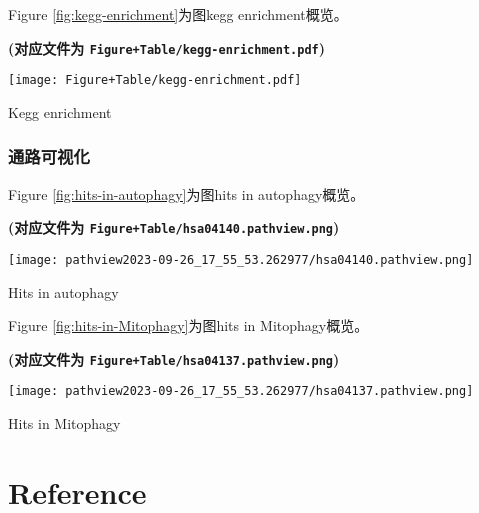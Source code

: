 \documentclass[
]{article}
\begin{document}
Figure \ref{fig:kegg-enrichment}为图kegg enrichment概览。

\textbf{(对应文件为 \texttt{Figure+Table/kegg-enrichment.pdf})}

\def\@captype{figure}
\begin{center}
\texttt{[image: Figure+Table/kegg-enrichment.pdf]}
\caption{Kegg enrichment}\label{fig:kegg-enrichment}
\end{center}

\hypertarget{ux901aux8defux53efux89c6ux5316}{%
\subsubsection{通路可视化}\label{ux901aux8defux53efux89c6ux5316}}

Figure \ref{fig:hits-in-autophagy}为图hits in autophagy概览。

\textbf{(对应文件为 \texttt{Figure+Table/hsa04140.pathview.png})}

\def\@captype{figure}
\begin{center}
\texttt{[image: pathview2023-09-26\_17\_55\_53.262977/hsa04140.pathview.png]}
\caption{Hits in autophagy}\label{fig:hits-in-autophagy}
\end{center}

Figure \ref{fig:hits-in-Mitophagy}为图hits in Mitophagy概览。

\textbf{(对应文件为 \texttt{Figure+Table/hsa04137.pathview.png})}

\def\@captype{figure}
\begin{center}
\texttt{[image: pathview2023-09-26\_17\_55\_53.262977/hsa04137.pathview.png]}
\caption{Hits in Mitophagy}\label{fig:hits-in-Mitophagy}
\end{center}

\hypertarget{bibliography}{%
\section*{Reference}\label{bibliography}}
\end{document}

